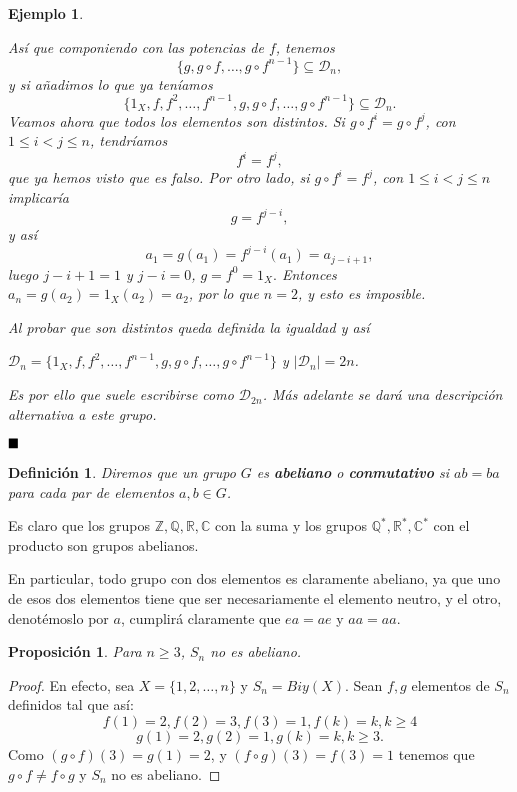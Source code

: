 \documentclass[12pt]{article}
\newtheorem{proposition}[theorem]{Proposición}
\newtheorem{definition}[theorem]{Definición}
\newtheorem{example}{Ejemplo}[theorem]
\begin{document}
\begin{example}
\begin{enumerate}
Así que componiendo con las potencias de $f$, tenemos $$\lbrace g, g \circ f, \ldots, g \circ f^{n-1} \rbrace \subseteq \mathcal{D}_{n},$$ y si añadimos lo que ya teníamos $$\lbrace 1_{X}, f, f^{2}, \ldots, f^{n-1}, g, g \circ f, \ldots, g \circ f^{n-1} \rbrace \subseteq \mathcal{D}_{n}.$$
Veamos ahora que todos los elementos son distintos. Si $g \circ f^{i} = g \circ f^{j}$, con $1 \leq i < j \leq n$, tendríamos $$f^{i} = f^{j},$$ que ya hemos visto que es falso. Por otro lado, si $g \circ f^{i} = f^{j}$, con $1 \leq i < j \leq n$ implicaría $$g = f^{j-i},$$ y así $$a_{1} = g(a_{1}) = f^{j-i} (a_{1}) = a_{j-i+1},$$ luego $j-i+1 = 1$ y $j-i = 0$, $g = f^{0} = 1_{X}.$ Entonces $a_{n} = g(a_{2}) = 1_{X}(a_{2}) = a_{2}$, por lo que $n=2$, y esto es imposible.

Al probar que son distintos queda definida la igualdad y así 
\begin{center}
$\mathcal{D}_{n} = \lbrace 1_{X}, f, f^{2}, \ldots, f^{n-1}, g, g \circ f, \ldots, g \circ f^{n-1} \rbrace$ y $|\mathcal{D}_{n}| = 2n$. 
\end{center}

Es por ello que suele escribirse como $\mathcal{D}_{2n}$. Más adelante se dará una descripción alternativa a este grupo.

\end{enumerate}
\end{example}

$\hfill \blacksquare$

\begin{definition}Diremos que un grupo $G$ es \textbf{abeliano} o \textbf{conmutativo} si $ab = ba$ para cada par de elementos $a,b \in G$.
\end{definition}

Es claro que los grupos $\mathbb{Z}, \mathbb{Q}, \mathbb{R}, \mathbb{C}$ con la suma y los grupos $\mathbb{Q}^\ast, \mathbb{R}^\ast, \mathbb{C}^\ast$ con el producto son grupos abelianos.

En particular, todo grupo con dos elementos es claramente abeliano, ya que uno de esos dos elementos tiene que ser necesariamente el elemento neutro, y el otro, denotémoslo por $a$, cumplirá claramente que $ea = ae$ y $aa = aa$.

\begin{proposition}Para $n \geq 3$, $S_n$ no es abeliano.
\end{proposition}
\begin{proof}
En efecto, sea $X = \lbrace 1, 2, \ldots, n \rbrace$ y $S_n = Biy(X)$. Sean $f,g$ elementos de $S_n$ definidos tal que así: $$f(1) = 2, f(2) = 3, f(3) = 1, f(k) = k, k \geq 4$$ $$g(1) = 2, g(2) = 1, g(k) = k, k \geq 3.$$ Como $(g \circ f)(3) = g(1) = 2$, y $(f\circ g)(3) = f(3) = 1$ tenemos que $g \circ f \neq f \circ g$ y $S_n$ no es abeliano.

\end{proof}
\end{document}
